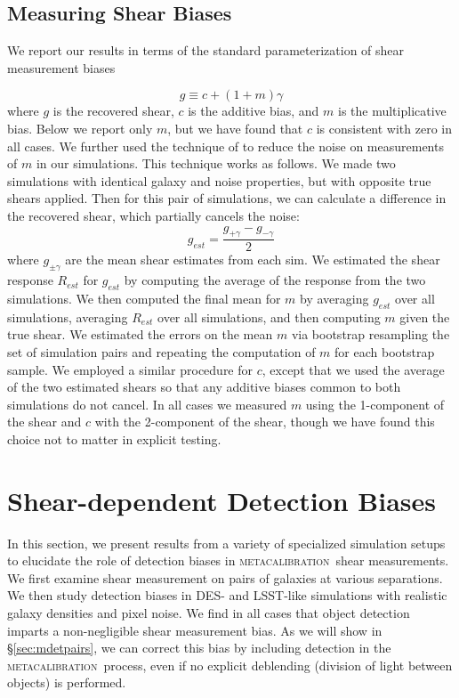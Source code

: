 \documentclass[iop, appendixfloats, numberedappendix, apj]{emulateapj}
\newcommand{\mcal}{\textsc{metacalibration}}
\begin{document}
\subsection{Measuring Shear Biases}

We report our results in terms of the standard parameterization of shear
measurement biases \citep[see, e.g.,][]{heymans2006}

\begin{equation}
g \equiv c + (1 + m)\gamma
\end{equation}
where $g$ is the recovered shear, $c$ is the additive bias, and $m$ is the
multiplicative bias. Below we report only $m$, but we have found that $c$ is
consistent with zero in all cases. We further used the technique of
\citet{pujol2019} to reduce the noise on measurements of $m$ in our simulations.
This technique works as follows. We made two simulations with identical galaxy
and noise properties, but with opposite true shears applied. Then for this pair
of simulations, we can calculate a difference in the recovered shear, which
partially cancels the noise:
\begin{equation}
g_{est} = \frac{g_{+\gamma} - g_{-\gamma}}{2}
\end{equation}
where $g_{\pm\gamma}$ are the mean shear estimates from each sim. We estimated
the shear response $R_{est}$ for $g_{est}$ by computing the average of the
response from the two simulations.  We then computed the final mean for $m$ by
averaging $g_{est}$ over all simulations, averaging $R_{est}$ over all
simulations, and then computing $m$ given the true shear. We estimated the
errors on the mean $m$ via bootstrap resampling the set of simulation pairs and
repeating the computation of $m$ for each bootstrap sample. We employed a
similar procedure for $c$, except that we used the average of the two estimated
shears so that any additive biases common to both simulations do not cancel. In
all  cases we measured $m$ using the 1-component of the shear and $c$ with the
2-component of the shear, though we have found this choice not to matter in
explicit testing.

\section{Shear-dependent Detection Biases}\label{sec:detbiases}

In this section, we present results from a variety of specialized simulation
setups to elucidate the role of detection biases in \mcal\ shear measurements.
We first examine shear measurement on pairs of galaxies at various separations.
We then study detection biases in DES- and LSST-like simulations with
realistic galaxy densities and pixel noise. We find in all cases that object
detection imparts a non-negligible shear measurement bias. As we will show in
\S \ref{sec:mdetpairs}, we can correct this bias by including detection in the
\mcal\ process, even if no explicit deblending (division of light between
objects) is performed.
\end{document}

